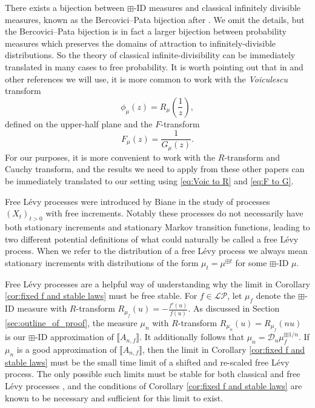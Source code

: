 \documentclass[reqno]{amsart}
\newcommand{\1}{\mathbf{1}}
\newcommand{\LP}{\mathcal{LP}}
\theoremstyle{plain}
\theoremstyle{definition}
\theoremstyle{remark}
\numberwithin{equation}{section}
\begin{document}
	There exists a bijection between $\boxplus$-ID measures and classical infinitely divisible measures, known as the Bercovici--Pata bijection after \cite{Bercovici-Pata1999}. We omit the details, but the Bercovici--Pata bijection is in fact a larger bijection between probability measures which preserves the domains of attraction to infinitely-divisible distributions. So the theory of classical infinite-divisibility can be immediately translated in many cases to free probability. It is worth pointing out that in \cite{Bercovici-Pata1999,Bercovici-Voiculescu1993,Bercovici-Voiculescu1995,Bercovici-Wang-Zhong2018} and other references we will use, it is more common to work with the \emph{Voiculescu} transform \begin{equation}\label{eq:Voic to R}
  	\phi_{\mu}(z)=R_{\mu}\left(\frac{1}{z}\right),
  \end{equation} defined on the upper-half plane and the $F$-transform \begin{equation}\label{eq:F to G}
  F_{\mu}(z)=\frac{1}{G_{\mu}(z)}.
  \end{equation} For our purposes, it is more convenient to work with the $R$-transform and Cauchy transform, and the results we need  to apply from these other papers can be immediately translated to our setting using \eqref{eq:Voic to R} and \eqref{eq:F to G}. 
  
  Free L\'evy processes were introduced by Biane \cite{Biane1998} in the study of processes $(X_t)_{t>0}$ with free increments. Notably these processes do not necessarily have both stationary increments and stationary Markov transition functions, leading to two different potential definitions of what could naturally be called a free L\'evy process. When we refer to the distribution of a free L\'evy process we always mean stationary increments with distributions of the form $\mu_{t}=\mu^{\boxplus t}$ for some $\boxplus$-ID $\mu$. 
  
  Free L\'evy processes are a helpful way of understanding why the limit in Corollary \ref{cor:fixed f and stable laws} must be free stable. For $f\in\LP$, let $\mu_{f}$ denote the $\boxplus$-ID measure with $R$-transform  $R_{\mu_f}(u)=-\frac{f'(u)}{f(u)}$. As discussed  in Section \ref{sec:outline_of_proof},  %
   the measure $\mu_{n}$ with $R$-transform $R_{\mu_n}(u)=R_{\mu_f}(nu)$ is our $\boxplus$-ID approximation of $\llbracket A_{n,f}\rrbracket$. It additionally follows that $\mu_{n}=\mathcal{D}_{n}\mu_{f}^{\boxplus{1}/{n}}$. If $\mu_{n}$ is a good approximation of $\llbracket A_{n,f}\rrbracket$, then the limit in Corollary \ref{cor:fixed f and stable laws} must be the small time limit of a shifted and re-scaled free L\'evy process. The only possible such limits must be stable for both classical and free L\'evy processes \cite{Arizmendi-Hasebe2018,Maller-Mason2008}, and the conditions of Corollary \ref{cor:fixed f and stable laws} are known to be necessary and sufficient for this limit to exist.  
\end{document}
